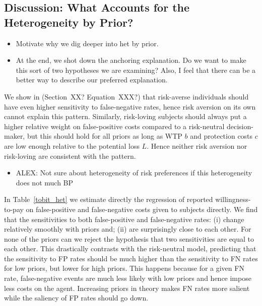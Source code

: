 \documentclass[12pt,a4paper]{article}
\newcommand{\agt}[1]{{\color{OliveGreen}#1}}
\newcommand{\aut}[1]{{\color{Red}#1}}
\begin{document}
\subsection{Discussion: What Accounts for the Heterogeneity by Prior?}

\begin{itemize}
	\item\agt{Motivate why we dig deeper into het by prior.}
	\item\agt{At the end, we shot down the anchoring explanation. Do we want to make this sort of two hypotheses we are examining? Also, I feel that there can be a better way to describe our preferred explanation. }
\end{itemize}

We show in (\agt{Section~XX? Equation~XXX?}) that risk-averse individuals should have even higher sensitivity to false-negative rates, hence risk aversion on its own cannot explain this pattern. Similarly, risk-loving subjects should always put a higher relative weight on false-positive costs compared to a risk-neutral decision-maker, but this should hold for all priors as long as WTP $b$ and protection costs $c$ are low enough relative to the potential loss $L$. Hence neither risk aversion nor risk-loving are consistent with the pattern. 

\begin{itemize}
	\item\aut{ALEX: Not sure about heterogeneity of risk preferences if this heterogeneity does not much BP}
\end{itemize}

In Table~\ref{tobit_het} we estimate directly the regression of reported willingness-to-pay on false-positive and false-negative costs given to subjects directly. We find that the sensitivities to both false-positive and false-negative rates: (i) change relatively smoothly with priors and; (ii) are surprisingly close to each other. For none of the priors can we reject the hypothesis that two sensitivities are equal to each other. This drastically contrasts with the risk-neutral model, predicting that the sensitivity to FP rates should be much higher than the sensitivity to FN rates for low priors, but lower for high priors. This happens because for a given FN rate, false-negative events are much less likely with low priors and hence impose less costs on the agent. Increasing priors in theory makes FN rates more salient while the saliency of FP rates should go down. 

\label{tobit_het}
\end{document}
